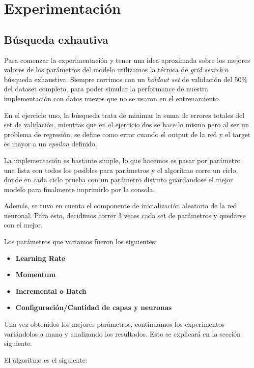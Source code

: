 \section{Experimentación}
\subsection{Búsqueda exhautiva}
Para comenzar la experimentación y tener una idea aproximada sobre los mejores valores de los parámetros del modelo utilizamos la técnica de \textit{grid search} o búsqueda exhaustiva. Siempre corrimos con un \textit{holdout set} de validación del 50\% del dataset completo, para poder simular la performance de nuestra implementación con datos nuevos que no se usaron en el entrenamiento. 

En el ejercicio uno, la búsqueda trata de minimar la suma de errores totales del set de validación, mientras que en el ejercicio dos se hace lo mismo pero al ser un problema de regresión, se define como error cuando el output de la red y el target es mayor a un \textit{epsilon} definido. 

La implementación es bastante simple, lo que hacemos es pasar por parámetro una lista con todos los posibles para parámetros y el algorítmo corre un ciclo, donde en cada ciclo prueba con un parámetro distinto guardandose el mejor modelo para finalmente imprimirlo por la consola. 

Además, se tuvo en cuenta el componente de inicialización aleatorio de la red neuronal. Para esto, decidimos correr 3 veces cada set de parámetros y quedarse con el mejor. 

Los parámetros que variamos fueron los siguientes:
\begin{itemize}
\item \textbf{Learning Rate}
\item \textbf{Momentum}
\item \textbf{Incremental o Batch}
\item \textbf{Configuración/Cantidad de capas y neuronas}
\end{itemize}

Una vez obtenidos los mejores parámetros, continuamos los experimentos variándolos a mano y analizando los resultados. Esto se explicará en la sección siguiente.

El algoritmo es el siguiente:

